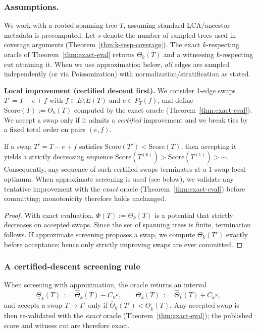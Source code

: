 \documentclass[11pt,letterpaper]{article}
\begin{document}
\subsubsection{Assumptions.}
We work with a rooted spanning tree $T$, assuming standard LCA/ancestor metadata is precomputed.
Let $s$ denote the number of sampled trees used in coverage arguments (Theorem~\ref{thm:k-resp-coverage}).
The exact $k$-respecting oracle of Theorem~\ref{thm:exact-eval} returns $\Theta_k(T)$ and a witnessing $k$-respecting cut attaining it.
When we use approximation below, \emph{all} edges are sampled independently (or via Poissonization) with normalization/stratification as stated.

\medskip
\noindent\textbf{Local improvement (certified descent first).}
We consider 1-edge swaps $T' = T-e+f$ with $f\in E\setminus E(T)$ and $e\in P_T(f)$, and define $\mathrm{Score}(T):=\Theta_k(T)$ computed by the exact oracle (Theorem~\ref{thm:exact-eval}).
We accept a swap only if it admits a \emph{certified} improvement and we break ties by a fixed total order on pairs $(e,f)$.

\begin{lemma}
\label{lem:local}
If a swap $T' = T-e+f$ satisfies $\mathrm{Score}(T') < \mathrm{Score}(T)$, then accepting it yields a strictly decreasing sequence $\mathrm{Score}(T^{(0)})>\mathrm{Score}(T^{(1)})>\cdots$.
Consequently, any sequence of such certified swaps terminates at a 1-swap local optimum.
When approximate screening is used (see below), we validate any tentative improvement with the \emph{exact} oracle (Theorem~\ref{thm:exact-eval}) before committing; monotonicity therefore holds unchanged.
\end{lemma}

\begin{proof}
With exact evaluation, $\Phi(T):=\Theta_k(T)$ is a potential that strictly decreases on accepted swaps.
Since the set of spanning trees is finite, termination follows.
If approximate screening proposes a swap, we compute $\Theta_k(T')$ exactly before acceptance; hence only strictly improving swaps are ever committed.
\end{proof}

\subsubsection{A certified-descent screening rule}
When screening with approximation, the oracle returns an interval
\[
\underline\Theta_k(T)\ :=\ \hat\Theta_k(T)-C_k\varepsilon,\qquad
\overline\Theta_k(T)\ :=\ \hat\Theta_k(T)+C_k\varepsilon,
\]
and accepts a swap $T\to T'$ only if $\overline\Theta_k(T') < \underline\Theta_k(T)$.
Any accepted swap is then re-validated with the \emph{exact} oracle (Theorem~\ref{thm:exact-eval}); the published score and witness cut are therefore exact.
\end{document}
